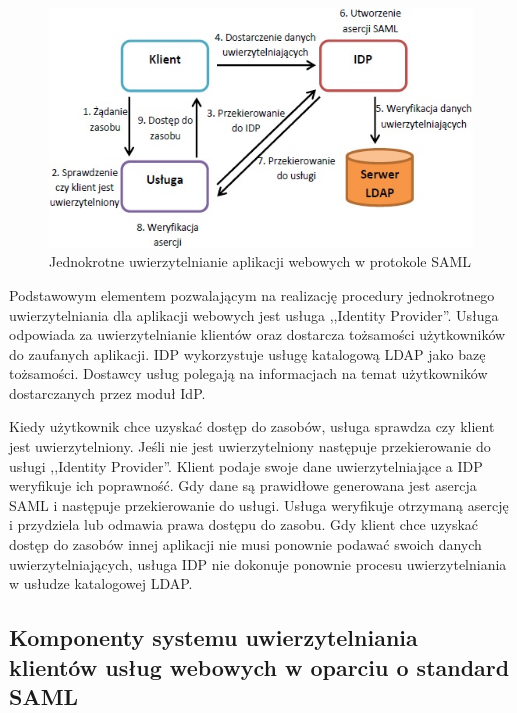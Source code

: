 		\begin{figure}[h]
			\centering
			\includegraphics{img/samlWebSSO.jpg}
			\caption{Jednokrotne uwierzytelnianie aplikacji webowych w protokole SAML}
			\label{Jednokrotne uwierzytelnianie aplikacji webowych w protokole SAML}
		\end{figure}

		Podstawowym elementem pozwalającym na realizację procedury jednokrotnego uwierzytelniania dla aplikacji webowych jest usługa ,,Identity Provider''. Usługa odpowiada za uwierzytelnianie klientów oraz dostarcza tożsamości użytkowników do zaufanych aplikacji. IDP wykorzystuje usługę katalogową LDAP jako bazę tożsamości. Dostawcy usług polegają na informacjach na temat użytkowników dostarczanych przez moduł IdP. 

		Kiedy użytkownik chce uzyskać dostęp do zasobów, usługa sprawdza czy klient jest uwierzytelniony. Jeśli nie jest uwierzytelniony następuje przekierowanie do usługi ,,Identity Provider''. Klient podaje swoje dane uwierzytelniające a IDP weryfikuje ich poprawność. Gdy dane są prawidłowe generowana jest asercja SAML i następuje przekierowanie do usługi. Usługa weryfikuje otrzymaną asercję i przydziela lub odmawia prawa dostępu do zasobu. Gdy klient chce uzyskać dostęp do zasobów innej aplikacji nie musi ponownie podawać swoich danych uwierzytelniających, usługa IDP nie dokonuje ponownie procesu uwierzytelniania w usłudze katalogowej LDAP.

	\subsection{Komponenty systemu uwierzytelniania klientów usług webowych w oparciu o standard SAML}

